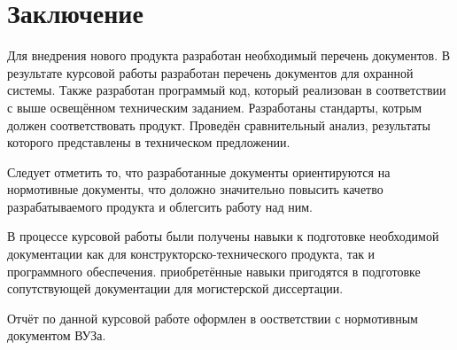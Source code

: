 \chapter*{Заключение}
Для внедрения нового продукта разработан необходимый перечень документов.
В результате курсовой работы разработан перечень документов для охранной системы.
Также разработан программый код, который реализован в соответствии с выше освещённом 
техническим заданием. Разработаны стандарты, котрым должен соответствовать продукт.
Проведён сравнительный анализ, результаты которого представлены в техническом
предложении.

Следует отметить то, что разработанные документы ориентируются на нормотивные документы,
что доложно значительно повысить качетво разрабатываемого продукта и облегсить работу над ним.

В процессе курсовой работы были получены навыки к подготовке необходимой документации как для
конструкторско-технического продукта, так и программного обеспечения. приобретённые навыки пригодятся
в подготовке сопутствующей документации для могистерской диссертации.

Отчёт по данной курсовой работе оформлен в оостветствии с нормотивным документом ВУЗа\cite{norm}.
